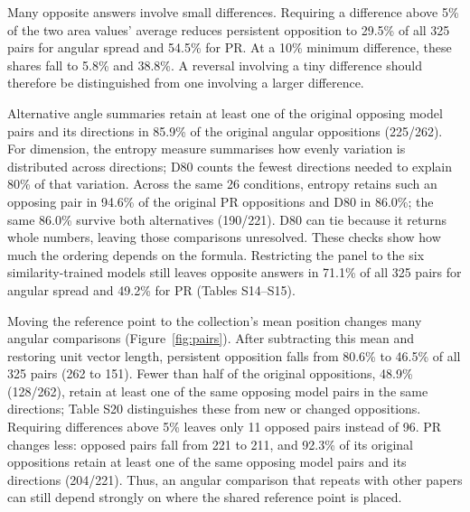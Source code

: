 \documentclass[12pt]{article}
\begin{document}
Many opposite answers involve small differences. Requiring a difference above 5\% of the two area values' average reduces persistent opposition to 29.5\% of all 325 pairs for angular spread and 54.5\% for PR. At a 10\% minimum difference, these shares fall to 5.8\% and 38.8\%. A reversal involving a tiny difference should therefore be distinguished from one involving a larger difference.

Alternative angle summaries retain at least one of the original opposing model pairs and its directions in 85.9\% of the original angular oppositions (225/262). For dimension, the entropy measure summarises how evenly variation is distributed across directions; D80 counts the fewest directions needed to explain 80\% of that variation. Across the same 26 conditions, entropy retains such an opposing pair in 94.6\% of the original PR oppositions and D80 in 86.0\%; the same 86.0\% survive both alternatives (190/221). D80 can tie because it returns whole numbers, leaving those comparisons unresolved. These checks show how much the ordering depends on the formula. Restricting the panel to the six similarity-trained models still leaves opposite answers in 71.1\% of all 325 pairs for angular spread and 49.2\% for PR (Tables S14--S15).

Moving the reference point to the collection's mean position changes many angular comparisons (Figure~\ref{fig:pairs}). After subtracting this mean and restoring unit vector length, persistent opposition falls from 80.6\% to 46.5\% of all 325 pairs (262 to 151). Fewer than half of the original oppositions, 48.9\% (128/262), retain at least one of the same opposing model pairs in the same directions; Table S20 distinguishes these from new or changed oppositions. Requiring differences above 5\% leaves only 11 opposed pairs instead of 96. PR changes less: opposed pairs fall from 221 to 211, and 92.3\% of its original oppositions retain at least one of the same opposing model pairs and its directions (204/221). Thus, an angular comparison that repeats with other papers can still depend strongly on where the shared reference point is placed.
\end{document}
